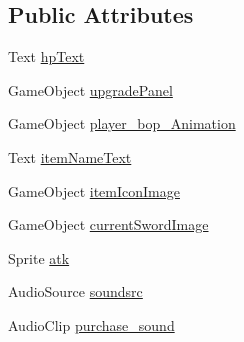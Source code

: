 \subsection*{Public Attributes}
\begin{DoxyCompactItemize}
\item 
Text \mbox{\hyperlink{class_inventory_abd3af35db0c0049ce91eaa99b1798a69}{hp\+Text}}
\item 
Game\+Object \mbox{\hyperlink{class_inventory_a4382ed8c55fa1899bf7a981ffac00523}{upgrade\+Panel}}
\item 
Game\+Object \mbox{\hyperlink{class_inventory_a69cd0d81a41a9e4a1e0dea6b45434084}{player\+\_\+bop\+\_\+\+Animation}}
\item 
Text \mbox{\hyperlink{class_inventory_aff3bb1bee86c2916dd649bf623cbb963}{item\+Name\+Text}}
\item 
Game\+Object \mbox{\hyperlink{class_inventory_ae035b7a3471724276238be3ec5d4769f}{item\+Icon\+Image}}
\item 
Game\+Object \mbox{\hyperlink{class_inventory_a7090ec7477cf37ce75e0722a0e792744}{current\+Sword\+Image}}
\item 
Sprite \mbox{\hyperlink{class_inventory_a8c34a2d39aab6ff22ec36e41763e2e22}{atk}}
\item 
Audio\+Source \mbox{\hyperlink{class_inventory_a28d3f85f956e83b94831df16b40a14ec}{soundsrc}}
\item 
Audio\+Clip \mbox{\hyperlink{class_inventory_af0bc00a8b9fb7d977b5f96eeedd7e166}{purchase\+\_\+sound}}
\end{DoxyCompactItemize}
